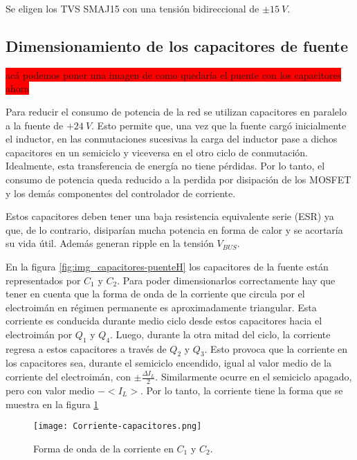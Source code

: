 \noindent Se eligen los TVS SMAJ15 con una tensión bidireccional de $\pm 15\:V$.

\subsection{Dimensionamiento de los capacitores de fuente}

\colorbox{red}{acá podemos poner una imagen de como quedaría el puente con los capacitores ahora}


\noindent Para reducir el consumo de potencia de la red se utilizan capacitores en paralelo a la fuente de $+24\:V$. Esto permite que, una vez que la fuente cargó inicialmente el inductor, en las conmutaciones sucesivas la carga del inductor pase a dichos capacitores en un semiciclo y viceversa en el otro ciclo de conmutación. Idealmente, esta transferencia de energía no tiene pérdidas. Por lo tanto, el consumo de potencia queda reducido a la perdida por disipación de los MOSFET y los demás componentes del controlador de corriente. 

\noindent Estos capacitores deben tener una baja resistencia equivalente serie (ESR) ya que, de lo contrario, disiparían mucha potencia en forma de calor y se acortaría su vida útil. Además generan ripple en la tensión $V_{BUS}$.

\noindent En la figura \ref{fig:img_capacitores-puenteH} los capacitores de la fuente están representados por $C_1$ y $C_2$. Para poder dimensionarlos correctamente hay que tener en cuenta que la forma de onda de la corriente que circula por el electroimán en régimen permanente es aproximadamente triangular. Esta corriente es conducida durante medio ciclo desde estos capacitores hacia el electroimán por $Q_1$ y $Q_4$. Luego, durante la otra mitad del ciclo, la corriente regresa a estos capacitores a través de $Q_2$ y $Q_3$. Esto provoca que la corriente en los capacitores sea, durante el semiciclo encendido, igual al valor medio de la corriente del electroimán, con $ \pm \frac{\Delta I_L}{2}$. Similarmente ocurre en el semiciclo apagado, pero con valor medio $-<I_L>$.  Por lo tanto,  la corriente tiene la forma que se muestra en la figura \ref{fig:img_ccorriente-capacitores}

\begin{figure}[H]
	\centering
	\texttt{[image: Corriente-capacitores.png]}
	\caption{Forma de onda de la corriente en $C_1$ y $C_2$.}
	\label{fig:img_ccorriente-capacitores}
\end{figure}

